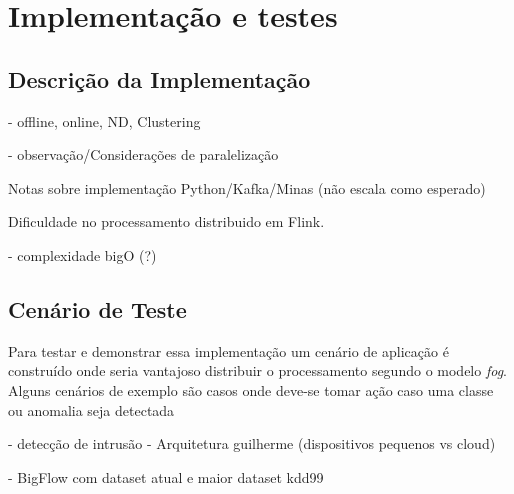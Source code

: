 \chapter{Implementação e testes}


\section{Descrição da Implementação}

- offline, online, ND, Clustering

- observação/Considerações de paralelização

Notas sobre implementação Python/Kafka/Minas (não escala como esperado)

Dificuldade no processamento distribuido em Flink.

- complexidade bigO (?)

\section{Cenário de Teste}

Para testar e demonstrar essa implementação um cenário de aplicação é construído
onde seria vantajoso distribuir o processamento segundo o modelo \emph{fog}. Alguns
cenários de exemplo são
casos onde deve-se tomar ação caso uma classe ou anomalia seja detectada



- detecção de intrusão
- Arquitetura guilherme (dispositivos pequenos vs cloud)
\cite{Cassales2019a}

- BigFlow com dataset atual e maior
dataset kdd99

